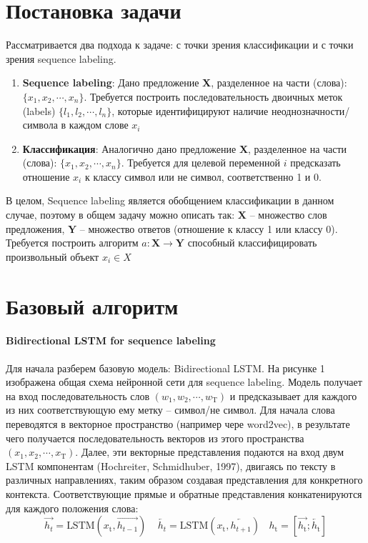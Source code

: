 \documentclass[12pt,twoside]{article}
\begin{document}
\section{Постановка задачи}
Рассматривается два подхода к задаче: с точки зрения классификации и с точки зрения sequence labeling.

\begin{enumerate}
	\item \textbf{Sequence labeling}: Дано предложение \textbf{X}, разделенное на части (слова): $\{x_1, x_2, \cdots, x_n\}$. Требуется построить последовательность двоичных меток (labels) $\{l_1, l_2, \cdots, l_n\}$, которые идентифицируют наличие неоднозначности/символа в каждом слове  $x_i$
	
	\item \textbf{Классификация}: Аналогично дано предложение \textbf{X}, разделенное на части (слова): $\{x_1, x_2, \cdots, x_n\}$. Требуется для целевой переменной $i$ предсказать отношение $x_i$ к классу символ или не символ, соответственно 1 и 0. 
\end{enumerate}

В целом, Sequence labeling является обобщением классификации в данном случае, поэтому в общем задачу можно описать так:
$\textbf{X}$ -- множество слов предложения, $\textbf{Y}$ -- множество ответов (отношение к классу 1 или классу 0). Требуется построить алгоритм $a: \textbf{X} \rightarrow \textbf{Y}$ способный классифицировать произвольный объект $x_i \in X$

\section{Базовый алгоритм}

\paragraph{Bidirectional LSTM for sequence labeling}
Для начала разберем базовую модель: Bidirectional LSTM. На рисунке 1 изображена общая схема нейронной сети для sequence labeling. Модель получает на вход последовательность слов $(w_1, w_2, \cdots, w_\text{T})$ и предсказывает для каждого из них соответствующую ему метку – символ/не символ. Для начала слова  переводятся в векторное пространство (например чере word2vec), в результате чего получается последовательность векторов из этого пространства $(x_1, x_2, \cdots, x_\text{T})$. Далее, эти векторные представления подаются на вход двум LSTM компонентам (Hochreiter, Schmidhuber, 1997), двигаясь по тексту в различных направлениях, таким образом создавая представления для конкретного контекста. Соответствующие прямые и обратные представления конкатенируются для каждого положения слова:
$$\overrightarrow{h_t} = \text{LSTM}(x_\text{t}, \overrightarrow{h_{t-1}})~~~~~
\overleftarrow{h_t} = \text{LSTM}(x_\text{t}, \overleftarrow{h_{t+1}})~~~~
h_\text{t} = [\overrightarrow{h_\text{t}};\overleftarrow{h_\text{t}}]$$
\end{document}

